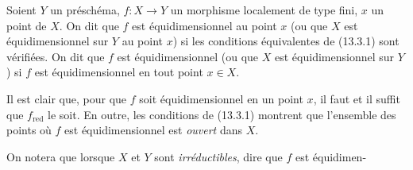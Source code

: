\begin{definition}[13.3.2]
\label{IV.13.3.2-fr}
Soient $Y$ un préschéma, $f:X\to Y$ un morphisme localement de type fini, $x$
un point de $X$. On dit que $f$ est équidimensionnel au point $x$ (ou que $X$
est équidimensionnel sur $Y$ au point $x$) si les conditions équivalentes de
(13.3.1) sont vérifiées. On dit que $f$ est équidimensionnel (ou que $X$ est
équidimensionnel sur $Y$) si $f$ est équidimensionnel en tout point $x\in X$.
\end{definition}

Il est clair que, pour que $f$ soit équidimensionnel en un point $x$, il faut
et il suffit que $f_{\mathrm{red}}$ le soit. En outre, les conditions de
(13.3.1) montrent que l'ensemble des points où $f$ est équidimensionnel est
\emph{ouvert} dans $X$.

On notera que lorsque $X$ et $Y$ sont \emph{irréductibles}, dire que $f$ est
équidimen-
